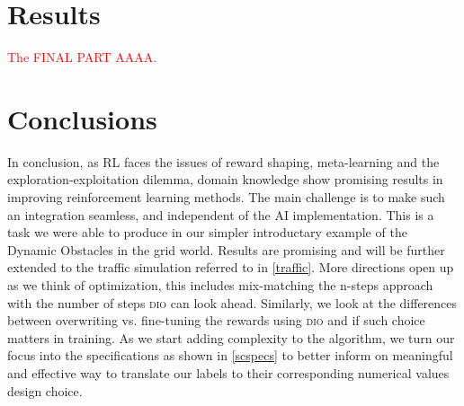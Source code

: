 \documentclass[acmsmall]{acmart}
\theoremstyle{definition}
\newcommand{\dio}{\textsc{dio}}
\begin{document}





\section{Results}
\textcolor{red}{The FINAL PART AAAA.}

 

\section{Conclusions}

In conclusion, as RL faces the issues of reward shaping, meta-learning and the exploration-exploitation dilemma, domain knowledge show promising results in 
improving reinforcement learning methods. The main challenge is to make such an integration seamless, and independent of the AI implementation. 
This is a task we were able to produce in our simpler introductary example of the Dynamic Obstacles in the grid world. Results are promising and will be further 
extended to the traffic simulation referred to in \ref{traffic}. More directions open up as we think of optimization, this includes mix-matching the n-steps approach with the 
number of steps \dio{} can look ahead. Similarly, we look at the differences between overwriting vs. fine-tuning the rewards using \dio{} and if such choice matters in training. 
As we start adding complexity to the algorithm, we turn our focus into the specifications as shown in \ref{scspecs} to better inform 
on meaningful and effective way to translate our labels to their corresponding numerical values design choice. 







\end{document}
